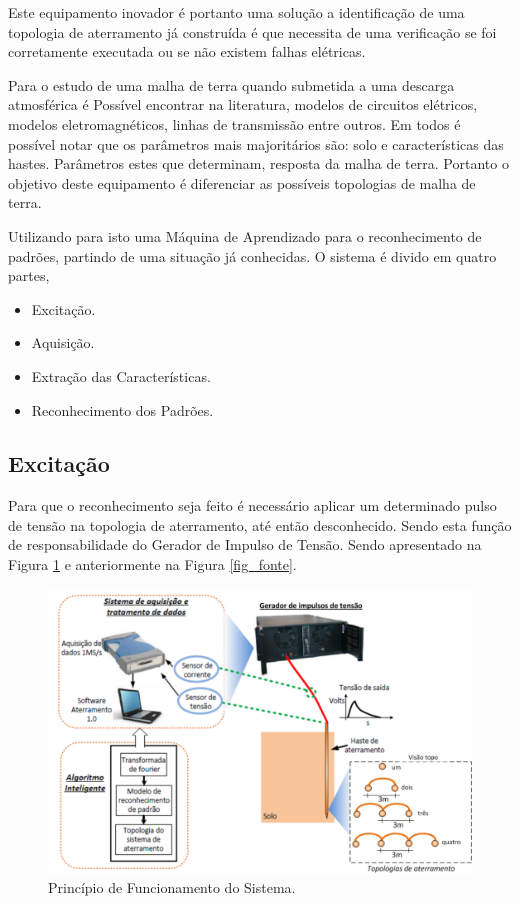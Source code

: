 \documentclass[a4paper, 10pt]{article}
\begin{document}
Este equipamento inovador é portanto uma solução a identificação de uma topologia
de aterramento já construída é que necessita de uma verificação se foi corretamente
executada ou se não existem falhas elétricas.

Para o estudo de uma malha de terra quando submetida a uma descarga atmosférica 
é Possível encontrar na literatura, modelos de circuitos elétricos, modelos 
eletromagnéticos, linhas de transmissão entre outros. Em todos é possível notar 
que os parâmetros mais majoritários são: solo e características das hastes. 
Parâmetros estes que determinam, resposta da malha de terra. Portanto o objetivo
deste equipamento é diferenciar as possíveis topologias de malha de terra. 

Utilizando para isto uma Máquina de Aprendizado para o reconhecimento de padrões, 
partindo de uma situação já conhecidas. O sistema é divido em quatro partes, 

\begin{itemize}
    \item Excitação.
    \item Aquisição.
    \item Extração das Características.
    \item Reconhecimento dos Padrões.
\end{itemize}

\subsection{Excitação}

Para que o reconhecimento seja feito é necessário aplicar um determinado pulso
de tensão na topologia de aterramento, até então desconhecido. 
Sendo esta função de responsabilidade do Gerador de Impulso de Tensão. 
Sendo apresentado na Figura \ref{fig_principio_funcionamento} e 
anteriormente na Figura \ref{fig_fonte}.

\begin{figure}[!h]
        \caption{\label{fig_principio_funcionamento}Princípio de Funcionamento do Sistema.}
	    \begin{center}
            \includegraphics[scale=0.3]{../fotos/principio/principio_de_funcionamento_corte.pdf}
	    \end{center}
\end{figure}
\end{document}
